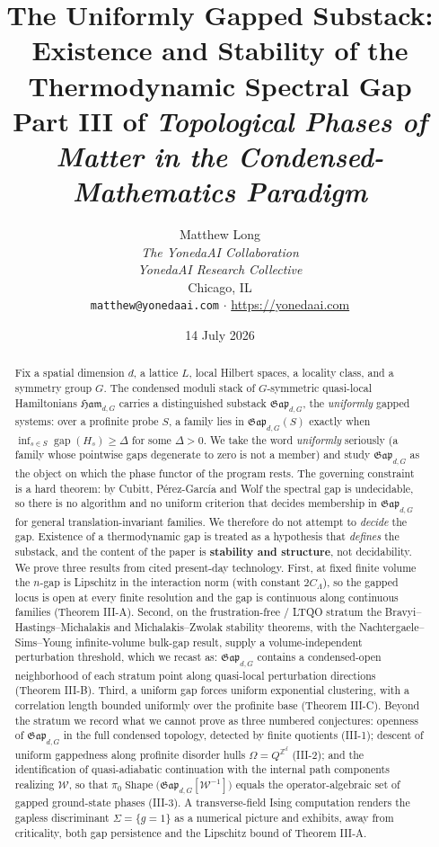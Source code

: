 \documentclass[12pt]{article}
\title{\textbf{The Uniformly Gapped Substack:\\
Existence and Stability of the Thermodynamic Spectral Gap}\\[0.4em]
\large Part III of \emph{Topological Phases of Matter in the Condensed-Mathematics Paradigm}}
\author{Matthew Long \\
\textit{The YonedaAI Collaboration} \\
\textit{YonedaAI Research Collective} \\
Chicago, IL \\
\texttt{matthew@yonedaai.com} $\cdot$ \url{https://yonedaai.com}}
\date{14 July 2026}
\newcommand{\Shape}{\operatorname{Shape}}      %
\newcommand{\Ham}{\mathfrak{Ham}}              %
\newcommand{\Gap}{\mathfrak{Gap}}              %
\newcommand{\Weq}{\mathcal{W}}                 %
\newcommand{\gapof}[1]{\operatorname{gap}(#1)} %
\newcommand{\gapbound}{\Delta}                  %
\newcommand{\Sig}{\Sigma}                       %
\newcommand{\dis}{\Omega}                       %
\newcommand{\Z}{\mathbb{Z}}
\DeclareMathOperator*{\einf}{inf}
\theoremstyle{plain}
\theoremstyle{definition}
\theoremstyle{remark}
\begin{document}
\maketitle

\begin{abstract}
Fix a spatial dimension $d$, a lattice $L$, local Hilbert spaces, a locality class,
and a symmetry group $G$. The condensed moduli stack of $G$-symmetric quasi-local
Hamiltonians $\Ham_{d,G}$ carries a distinguished substack $\Gap_{d,G}$, the
\emph{uniformly} gapped systems: over a profinite probe $S$, a family lies in
$\Gap_{d,G}(S)$ exactly when $\einf_{s\in S}\gapof{H_s}\ge\gapbound$ for some
$\gapbound>0$. We take the word \emph{uniformly} seriously (a family whose
pointwise gaps degenerate to zero is not a member) and study $\Gap_{d,G}$ as the
object on which the phase functor of the program rests. The governing constraint is
a hard theorem: by Cubitt, P\'erez-Garc\'ia and Wolf the spectral gap is
undecidable, so there is no algorithm and no uniform criterion that decides
membership in $\Gap_{d,G}$ for general translation-invariant families. We therefore
do not attempt to \emph{decide} the gap. Existence of a thermodynamic gap is treated
as a hypothesis that \emph{defines} the substack, and the content of the paper is
\textbf{stability and structure}, not decidability. We prove three results from
cited present-day technology. First, at fixed finite volume the $n$-gap is
Lipschitz in the interaction norm (with constant $2C_\Lambda$), so the gapped locus is open at every finite
resolution and the gap is continuous along continuous families (Theorem III-A)\@.
Second, on the frustration-free / LTQO stratum the Bravyi--Hastings--Michalakis and
Michalakis--Zwolak stability theorems, with the Nachtergaele--Sims--Young
infinite-volume bulk-gap result, supply a volume-independent perturbation threshold,
which we recast as: $\Gap_{d,G}$ contains a condensed-open neighborhood of each
stratum point along quasi-local perturbation directions (Theorem III-B)\@. Third, a
uniform gap forces uniform exponential clustering, with a correlation length bounded
uniformly over the profinite base (Theorem III-C)\@. Beyond the stratum we record what
we cannot prove as three numbered conjectures: openness of $\Gap_{d,G}$ in the full
condensed topology, detected by finite quotients (III-1); descent of uniform
gappedness along profinite disorder hulls $\dis=Q^{\Z^d}$ (III-2); and the
identification of quasi-adiabatic continuation with the internal path components
realizing $\Weq$, so that $\pi_0\Shape\!\big(\Gap_{d,G}[\Weq^{-1}]\big)$ equals the
operator-algebraic set of gapped ground-state phases (III-3). A transverse-field
Ising computation renders the gapless discriminant $\Sig=\{g=1\}$ as a numerical
picture and exhibits, away from criticality, both gap persistence and the Lipschitz
bound of Theorem III-A.
\end{abstract}
\end{document}
